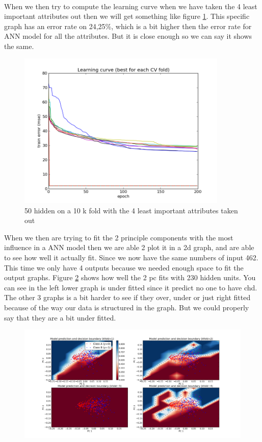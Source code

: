 \\
When we then try to compute the learning curve when we have taken the 4 least important attributes out then we will get something like figure \ref{notfull_10_25_50}. This specific graph has an error rate on 24,25\%, which is a bit higher then the error rate for ANN model for all the attributes. But it is close enough so we can say it shows the same.
\begin{figure}[!h]
\centering
\includegraphics[width=10cm, keepaspectratio=true]{pictures/figure_1.png}
\vspace{-0.4cm}
\caption{\footnotesize 50 hidden on a 10 k fold with the 4 least important attributes taken out}
\label{notfull_10_25_50}
\end{figure}
\newpage
When we then are trying to fit the 2 principle components with the most influence in a ANN model then we are able 2 plot it in a 2d graph, and are able to see how well it actually fit. Since we now have the same numbers of input 462. This time we only have 4 outputs because we needed enough space to fit the output graphs. Figure \ref{ann} shows how well the 2 pc fits with 230 hidden units. You can see in the left lower graph is under fitted since it predict no one to have chd. The other 3 graphs is a bit harder to see if they over, under or just right fitted because of the way our data is structured in the graph. But we could properly say that they are a bit under fitted.
\begin{figure}[!h]
\centering
\includegraphics[width=15cm, keepaspectratio=true]{pictures/ann_2_4_230.png}
\vspace{-0.4cm}
\caption{\footnotesize }
\label{ann}
\end{figure}
